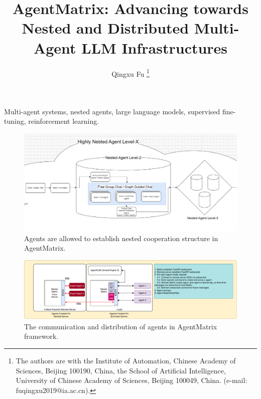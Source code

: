 \documentclass[lettersize,journal]{IEEEtran}
\begin{document}
\title{
  AgentMatrix: Advancing towards Nested and Distributed Multi-Agent LLM Infrastructures
}
\author {
    Qingxu Fu
    \thanks{
    The authors are with the Institute of Automation, Chinese Academy of Sciences, Beijing 100190, China,
    the School of Artificial Intelligence, University of Chinese Academy of Sciences, Beijing 100049, China.
    (e-mail: fuqingxu2019@ia.ac.cn).
    }%
}


\maketitle

\begin{abstract}
  
\end{abstract}

\begin{IEEEkeywords}
Multi-agent systems, nested agents, large language models, supervised fine-tuning, reinforcement learning.
\end{IEEEkeywords}


\begin{figure}[ht]
  \centering
  \includegraphics[width=0.9\linewidth]{drawio/299397865-1e63278f-0453-4b84-83c7-deb7c92ac466.png}
  \caption{Agents are allowed to establish nested cooperation structure in AgentMatrix.}
  \label{fig:agent_nestded}
  \end{figure}

\begin{figure}[ht]
  \centering
  \includegraphics[width=0.9\linewidth]{drawio/distributed-phase2.drawio.pdf}
  \caption{The communication and distribution of agents in AgentMatrix framework.}
  \label{fig:agent_com}
  \end{figure}
\end{document}
